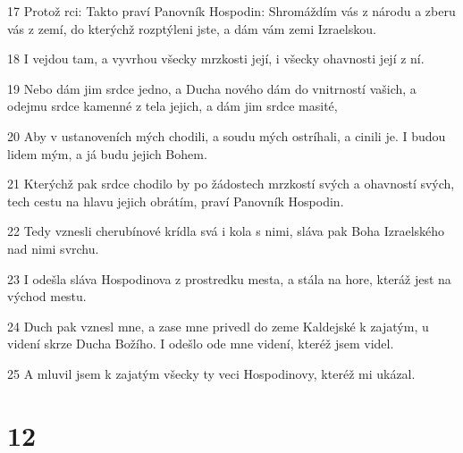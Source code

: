 \par 17 Protož rci: Takto praví Panovník Hospodin: Shromáždím vás z národu a zberu vás z zemí, do kterýchž rozptýleni jste, a dám vám zemi Izraelskou.
\par 18 I vejdou tam, a vyvrhou všecky mrzkosti její, i všecky ohavnosti její z ní.
\par 19 Nebo dám jim srdce jedno, a Ducha nového dám do vnitrností vašich, a odejmu srdce kamenné z tela jejich, a dám jim srdce masité,
\par 20 Aby v ustanoveních mých chodili, a soudu mých ostríhali, a cinili je. I budou lidem mým, a já budu jejich Bohem.
\par 21 Kterýchž pak srdce chodilo by po žádostech mrzkostí svých a ohavností svých, tech cestu na hlavu jejich obrátím, praví Panovník Hospodin.
\par 22 Tedy vznesli cherubínové krídla svá i kola s nimi, sláva pak Boha Izraelského nad nimi svrchu.
\par 23 I odešla sláva Hospodinova z prostredku mesta, a stála na hore, kteráž jest na východ mestu.
\par 24 Duch pak vznesl mne, a zase mne privedl do zeme Kaldejské k zajatým, u videní skrze Ducha Božího. I odešlo ode mne videní, kteréž jsem videl.
\par 25 A mluvil jsem k zajatým všecky ty veci Hospodinovy, kteréž mi ukázal.

\chapter{12}

